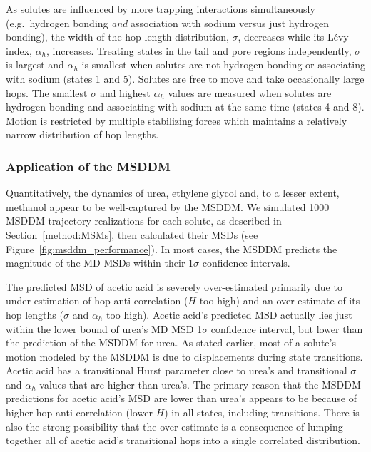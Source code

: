 \documentclass[journal=jctcce,manuscript=article]{achemso}
\begin{document}
  As solutes are influenced by more trapping interactions simultaneously
  (e.g.~hydrogen bonding \textit{and} association with sodium versus just
  hydrogen bonding), the width of the hop length distribution, $\sigma$,
  decreases while its L\'evy index, $\alpha_h$, increases. Treating states in
  the tail and pore regions independently, $\sigma$ is largest and $\alpha_h$
  is smallest when solutes are not hydrogen bonding or associating with sodium
  (states 1 and 5). Solutes are free to move and take occasionally large hops.
  The smallest $\sigma$ and highest $\alpha_h$ values are measured when solutes
  are hydrogen bonding and associating with sodium at the same time (states 4
  and 8). Motion is restricted by multiple stabilizing forces which maintains a
  relatively narrow distribution of hop lengths.
  
  \subsubsection{Application of the MSDDM}\label{section:msddm_application}
  
  Quantitatively, the dynamics of urea, ethylene glycol and, to a lesser extent, 
  methanol appear to be well-captured by the MSDDM. We simulated 1000 MSDDM trajectory realizations
  for each solute, as described in Section~\ref{method:MSMs}, then calculated their
  MSDs (see Figure~\ref{fig:msddm_performance}). In most cases, the MSDDM predicts
  the magnitude of the MD MSDs within their 1$\sigma$ confidence intervals. 
 
  The predicted MSD of acetic acid is severely over-estimated primarily due to
  under-estimation of hop anti-correlation ($H$ too high) and an over-estimate
  of its hop lengths ($\sigma$ and $\alpha_h$ too high). Acetic acid's
  predicted MSD actually lies just within the lower bound of urea's MD MSD
  1$\sigma$ confidence interval, but lower than the prediction of the MSDDM for
  urea. As stated earlier, most of a solute’s motion modeled by the MSDDM is
  due to displacements during state transitions. Acetic acid has a transitional
  Hurst parameter close to urea’s and transitional $\sigma$ and $\alpha_h$
  values that are higher than urea’s. The primary reason that the MSDDM
  predictions for acetic acid's MSD are lower than urea's appears to be because
  of higher hop anti-correlation (lower $H$) in all states, including
  transitions. There is also the strong possibility that the over-estimate is
  a consequence of lumping together all of acetic acid’s transitional hops into
  a single correlated distribution.
\end{document}
